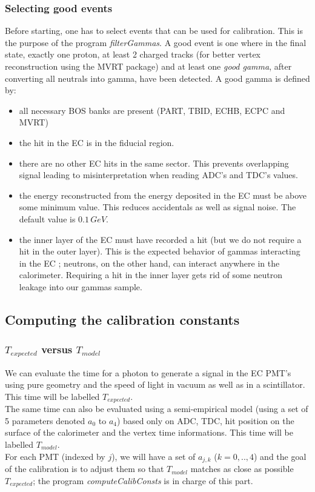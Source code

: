 \documentclass [12pt,letterpaper]{article}
\begin{document}
\subsubsection{Selecting good events}
Before starting, one has to select events that can be used for calibration. This is the purpose of the program {\em filterGammas}. A good event is one where in the final state, exactly one proton, at least 2 charged tracks (for better vertex reconstruction using the MVRT package) and at least one {\em good gamma}, after converting all neutrals into gamma,  have been detected. A good gamma is defined by: \\

\begin{itemize}
\item all necessary BOS banks are present (PART, TBID, ECHB, ECPC and MVRT)
\item the hit in the EC is in the fiducial region.
\item there are no other EC hits in the same sector. This prevents overlapping signal leading to misinterpretation when reading ADC's and TDC's values.
\item the energy reconstructed from the energy deposited in the EC must be above some minimum value. This reduces accidentals as well as signal noise. The default value is $0.1\,GeV$.
\item the inner layer of the EC must have recorded a hit (but we do not require a hit in the outer layer). This is the expected behavior of gammas interacting in the EC ; neutrons, on the other hand, can interact anywhere in the calorimeter. Requiring a hit in the inner layer gets rid of some neutron leakage into our gammas sample.
\end{itemize}


\subsection{Computing the calibration constants}
\subsubsection{ $T_{expected}$ versus $T_{model}$ }
We can evaluate the time for a photon to generate a signal in the EC PMT's using pure geometry and the speed of light in vacuum as well as in a scintillator. This time will be labelled $T_{expected}$.\\
The same time can also be evaluated using a semi-empirical model (using a set of 5 parameters denoted $a_{0}$ to $a_{4}$) based only on ADC, TDC, hit position on the surface of the calorimeter and the vertex time informations. This time will be labelled $T_{model}$.\\
For each PMT (indexed by $j$), we will have a set of $a_{j,k}$ ($k = 0, .., 4$) and the goal of the calibration is to adjust them so that $T_{model}$ matches as close as possible $T_{expected}$; the program {\it computeCalibConsts} is in charge of this part.  
\end{document}
